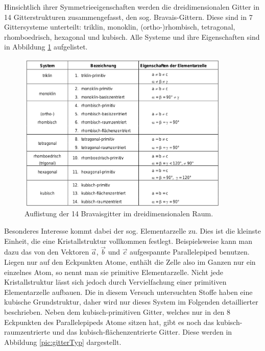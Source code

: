 Hinsichtlich ihrer Symmetrieeigenschaften werden die dreidimensionalen Gitter in 14 Gitterstrukturen zusammengefasst, den sog. Bravais-Gittern. Diese sind in 7 Gittersysteme unterteilt: triklin, monoklin, (ortho-)rhombisch, tetragonal, rhomboedrisch, hexagonal und kubisch. Alle Systeme und ihre Eigenschaften sind in Abbildung \ref{pic:bravais} aufgelistet.
\begin{figure}[htbp]
	\includegraphics[width=0.9\textwidth]{../pics/bravais.png}
	\caption{Auflistung der 14 Bravaisgitter im dreidimensionalen Raum.}
	\label{pic:bravais}
\end{figure}

Besonderes Interesse  kommt dabei der sog. Elementarzelle zu. Dies ist die kleinste Einheit, die eine Kristallstruktur vollkommen festlegt. Beispielsweise kann man dazu das von den Vektoren $\vec{a}$, $\vec{b}$ und $\vec{c}$ aufgespannte Parallelepiped benutzen. Liegen nur auf den Eckpunkten Atome, enthält die Zelle also im Ganzen nur ein einzelnes Atom, so nennt man sie primitive Elementarzelle. 
Nicht jede Kristallstruktur lässt sich jedoch durch Vervielfachung einer primitiven Elementarzelle aufbauen. Die in diesem Versuch untersuchten Stoffe haben eine kubische Grundstruktur, daher wird nur dieses System im Folgenden detaillierter beschrieben. Neben dem kubisch-primitiven Gitter, welches nur in den 8 Eckpunkten des Parallelepipeds Atome sitzen hat, gibt es noch das kubisch-raumzentrierte und das kubisch-flächenzentrierte Gitter. Diese werden in Abbildung \ref{pic:gitterTyp} dargestellt.

